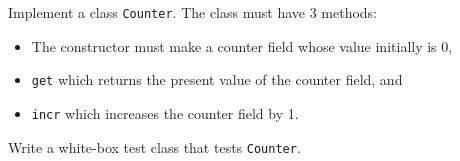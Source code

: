 Implement a class \lstinline{Counter}. The class must have 3 methods:
\begin{itemize}
\item The constructor must make a counter field whose value initially is 0,
\item \lstinline{get} which returns the present value of the counter field, and
\item \lstinline{incr} which increases the counter field by 1.
\end{itemize}
Write a white-box test class that tests \lstinline{Counter}.
